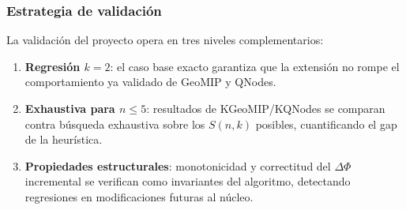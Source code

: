 \subsubsection*{Estrategia de validación}

La validación del proyecto opera en tres niveles complementarios:

\begin{enumerate}
  \item \textbf{Regresión $k=2$}: el caso base exacto garantiza que la extensión
        no rompe el comportamiento ya validado de GeoMIP y QNodes.
  \item \textbf{Exhaustiva para $n \le 5$}: resultados de KGeoMIP/KQNodes
        se comparan contra búsqueda exhaustiva sobre los $S(n,k)$ posibles,
        cuantificando el gap de la heurística.
  \item \textbf{Propiedades estructurales}: monotonicidad y correctitud
        del $\Delta\Phi$ incremental se verifican como invariantes del algoritmo,
        detectando regresiones en modificaciones futuras al núcleo.
\end{enumerate}
